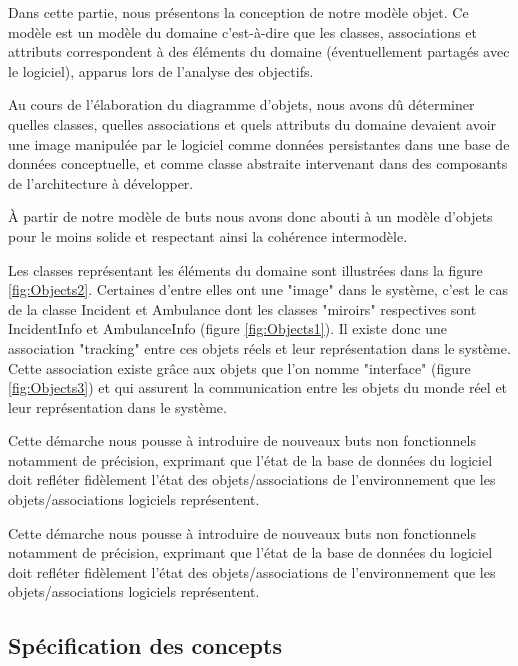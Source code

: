 Dans cette partie, nous présentons la conception de notre modèle objet. Ce
modèle est un modèle du domaine c'est-à-dire que les classes, associations
et attributs correspondent à des éléments du domaine (éventuellement
partagés avec le logiciel), apparus lors de l'analyse des objectifs. 

Au cours de l'élaboration du diagramme d'objets, nous avons dû déterminer
quelles classes, quelles associations et quels attributs du domaine devaient avoir une
image manipulée par le logiciel comme données persistantes dans une base de
données conceptuelle, et comme classe abstraite intervenant dans des
composants de l'architecture à développer. 

À partir de notre modèle de buts nous avons donc abouti à un modèle d'objets
pour le moins solide et respectant ainsi la cohérence intermodèle. 

Les classes représentant les éléments du domaine sont illustrées dans la
figure \ref{fig:Objects2}. Certaines d'entre elles ont une "image" dans le système, c'est
le cas de la classe Incident et Ambulance dont les classes "miroirs"
respectives sont IncidentInfo et AmbulanceInfo (figure  \ref{fig:Objects1}). Il existe donc
une association "tracking" entre ces objets réels et leur représentation
dans le système. Cette association existe grâce aux objets que l'on nomme
"interface" (figure  \ref{fig:Objects3}) et qui assurent la communication entre les objets du
monde réel et leur représentation dans le système. 

Cette démarche nous pousse à introduire de nouveaux buts non fonctionnels
notamment de précision, exprimant que l'état de la base de données du
logiciel doit refléter fidèlement l'état des objets/associations de
l'environnement que les objets/associations logiciels représentent. 


Cette démarche nous pousse à introduire de nouveaux buts non fonctionnels
notamment de précision, exprimant que l'état de la base de données du
logiciel doit refléter fidèlement l'état des objets/associations de
l'environnement que les objets/associations logiciels représentent. 


\subsection{Spécification des concepts}

